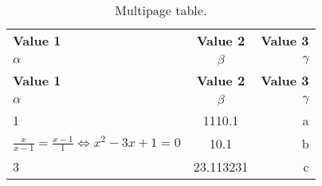\begin{longtable}[c]{lSr} %
		\caption{Multipage table.}
		\label{tab:tableww1}\\
		\toprule
		\textbf{Value 1} & \textbf{Value 2} & \textbf{Value 3}\\
		$\alpha$ & $\beta$ & $\gamma$ \\
		\midrule
		\endfirsthead %
		\toprule
		\textbf{Value 1} & \textbf{Value 2} & \textbf{Value 3}\\
		$\alpha$ & $\beta$ & $\gamma$ \\
		\midrule
		 & 1110.1 & a\\
		$\frac{x}{x-1}=\frac{x-1}{1}\Longleftrightarrow x^2-3x+1=0$ & 10.1 & b\\
		3 & 23.113231 & c\\
		\bottomrule
	\end{longtable}


